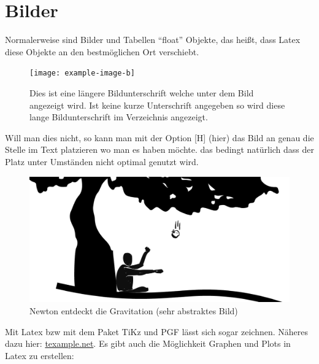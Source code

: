 \section{Bilder}
\label{sec:bilder}
Normalerweise sind Bilder und Tabellen "`float"' Objekte, das heißt, dass Latex diese Objekte an den bestmöglichen Ort verschiebt. 
\begin{figure}[H]
	\centering
	\texttt{[image: example-image-b]} 
	\caption[Dies ist eine kürzere Bildunterschrift (Verzeichnis)]{Dies ist eine längere Bildunterschrift welche unter dem Bild angezeigt wird. Ist keine kurze Unterschrift angegeben so wird diese lange Bildunterschrift im Verzeichnis angezeigt.}
	\label{fig:testbild}
\end{figure}
Will man dies nicht, so kann man mit der Option [H] (hier) das Bild an genau die Stelle im Text platzieren wo man es haben möchte. das bedingt natürlich dass der Platz unter Umständen nicht optimal genutzt wird.
\begin{figure}[H]
	\centering
	\includegraphics[width=0.7\linewidth]{bilder/newton}
	\caption{Newton entdeckt die Gravitation (sehr abstraktes Bild)}
	\label{fig:newton}
\end{figure}

Mit Latex bzw mit dem Paket TiKz und PGF lässt sich sogar zeichnen. Näheres dazu hier: \href{http://www.texample.net/tikz/examples/}{texample.net}. Es gibt auch die Möglichkeit Graphen und Plots in Latex zu erstellen:


%
\clearpage
